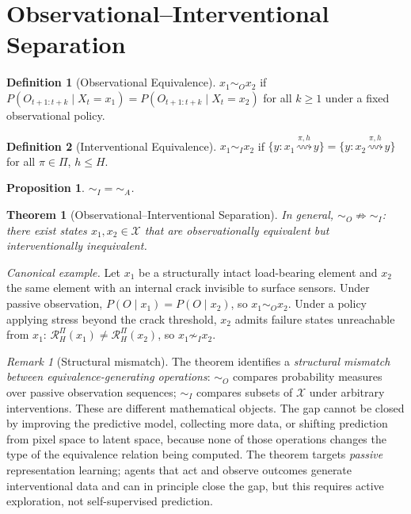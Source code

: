 \documentclass[10pt,twocolumn]{article}
\theoremstyle{plain}
\newtheorem{theorem}{Theorem}
\newtheorem{proposition}{Proposition}
\theoremstyle{definition}
\newtheorem{definition}{Definition}
\theoremstyle{remark}
\newtheorem{remark}{Remark}
\newcommand{\simA}{\sim_{\!A}}
\newcommand{\simO}{\sim_{\!O}}
\newcommand{\simI}{\sim_{\!I}}
\newcommand{\RHP}{\mathcal{R}_{H}^{\Pi}}
\newcommand{\calX}{\mathcal{X}}
\begin{document}
\section{Observational--Interventional Separation}
\label{sec:oi}

\begin{definition}[Observational Equivalence]
$x_1\simO x_2$ if $P(O_{t+1:t+k}\mid X_t=x_1)=P(O_{t+1:t+k}\mid X_t=x_2)$
for all $k\geq 1$ under a fixed observational policy.
\end{definition}

\begin{definition}[Interventional Equivalence]
$x_1\simI x_2$ if $\{y:x_1\overset{\pi,h}{\rightsquigarrow}y\}=\{y:x_2\overset{\pi,h}{\rightsquigarrow}y\}$
for all $\pi\in\Pi$, $h\leq H$.
\end{definition}

\begin{proposition}
\label{prop:id}
$\simI = \simA$.
\end{proposition}

\begin{theorem}[Observational--Interventional Separation]
\label{thm:oi}
In general, $\simO \not\Rightarrow \simI$: there exist states
$x_1,x_2\in\calX$ that are observationally equivalent but interventionally
inequivalent.
\end{theorem}

\noindent\textit{Canonical example.} Let $x_1$ be a structurally intact
load-bearing element and $x_2$ the same element with an internal crack invisible
to surface sensors. Under passive observation, $P(O\mid x_1)=P(O\mid x_2)$, so
$x_1\simO x_2$. Under a policy applying stress beyond the crack threshold,
$x_2$ admits failure states unreachable from $x_1$: $\RHP(x_1)\neq\RHP(x_2)$,
so $x_1\not\simI x_2$.

\begin{remark}[Structural mismatch]
\label{rem:mismatch}
The theorem identifies a \emph{structural mismatch between equivalence-generating
operations}: $\simO$ compares probability measures over passive observation
sequences; $\simI$ compares subsets of $\calX$ under arbitrary interventions.
These are different mathematical objects. The gap cannot be closed by improving
the predictive model, collecting more data, or shifting prediction from pixel
space to latent space, because none of those operations changes the type of the
equivalence relation being computed. The theorem targets \emph{passive}
representation learning; agents that act and observe outcomes generate
interventional data and can in principle close the gap, but this requires active
exploration, not self-supervised prediction.
\end{remark}
\end{document}
